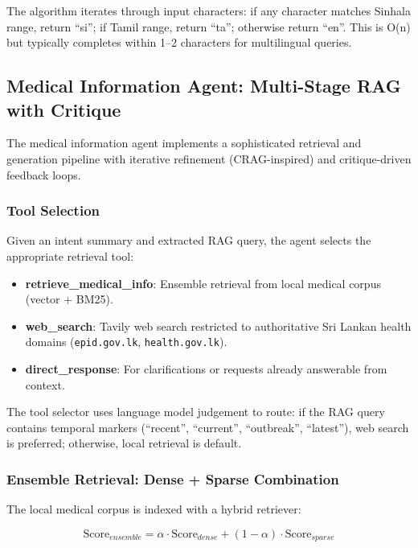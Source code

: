 \documentclass[11pt,a4paper]{article}
\begin{document}
The algorithm iterates through input characters: if any character matches Sinhala range, return ``si''; if Tamil range, return ``ta''; otherwise return ``en''. This is O(n) but typically completes within 1--2 characters for multilingual queries.

\subsection{Medical Information Agent: Multi-Stage RAG with Critique}
\label{sec:medical-info-agent}

The medical information agent implements a sophisticated retrieval and generation pipeline with iterative refinement (CRAG-inspired) and critique-driven feedback loops.

\subsubsection{Tool Selection}
Given an intent summary and extracted RAG query, the agent selects the appropriate retrieval tool:

\begin{itemize}
    \item \textbf{retrieve\_medical\_info}: Ensemble retrieval from local medical corpus (vector + BM25).
    \item \textbf{web\_search}: Tavily web search restricted to authoritative Sri Lankan health domains (\texttt{epid.gov.lk}, \texttt{health.gov.lk}).
    \item \textbf{direct\_response}: For clarifications or requests already answerable from context.
\end{itemize}

The tool selector uses language model judgement to route: if the RAG query contains temporal markers (``recent'', ``current'', ``outbreak'', ``latest''), web search is preferred; otherwise, local retrieval is default.

\subsubsection{Ensemble Retrieval: Dense + Sparse Combination}
\label{sec:ensemble-retrieval}

The local medical corpus is indexed with a hybrid retriever:

\begin{equation}
\text{Score}_{ensemble} = \alpha \cdot \text{Score}_{dense} + (1 - \alpha) \cdot \text{Score}_{sparse}
\end{equation}
\end{document}

